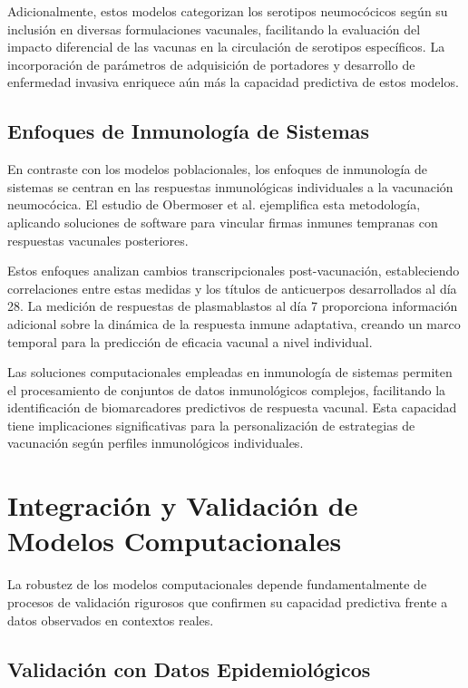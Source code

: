 Adicionalmente, estos modelos categorizan los serotipos neumocócicos según su inclusión en diversas formulaciones vacunales, facilitando la evaluación del impacto diferencial de las vacunas en la circulación de serotipos específicos. La incorporación de parámetros de adquisición de portadores y desarrollo de enfermedad invasiva enriquece aún más la capacidad predictiva de estos modelos.

\subsection{Enfoques de Inmunología de Sistemas}

En contraste con los modelos poblacionales, los enfoques de inmunología de sistemas se centran en las respuestas inmunológicas individuales a la vacunación neumocócica. El estudio de Obermoser et al. \cite{Obermoser2013} ejemplifica esta metodología, aplicando soluciones de software para vincular firmas inmunes tempranas con respuestas vacunales posteriores.

Estos enfoques analizan cambios transcripcionales post-vacunación, estableciendo correlaciones entre estas medidas y los títulos de anticuerpos desarrollados al día 28. La medición de respuestas de plasmablastos al día 7 proporciona información adicional sobre la dinámica de la respuesta inmune adaptativa, creando un marco temporal para la predicción de eficacia vacunal a nivel individual.

Las soluciones computacionales empleadas en inmunología de sistemas permiten el procesamiento de conjuntos de datos inmunológicos complejos, facilitando la identificación de biomarcadores predictivos de respuesta vacunal. Esta capacidad tiene implicaciones significativas para la personalización de estrategias de vacunación según perfiles inmunológicos individuales.

\section{Integración y Validación de Modelos Computacionales}

La robustez de los modelos computacionales depende fundamentalmente de procesos de validación rigurosos que confirmen su capacidad predictiva frente a datos observados en contextos reales.

\subsection{Validación con Datos Epidemiológicos}


